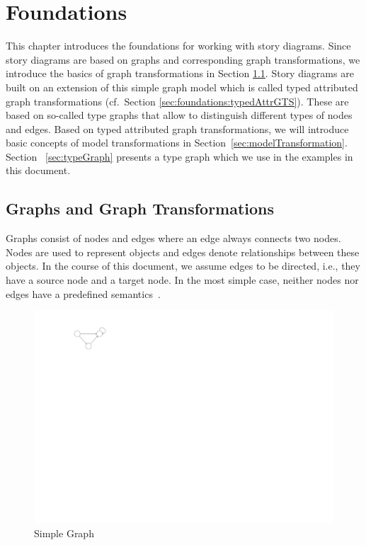 \chapter{Foundations}
\label{sec:foundations}

This chapter introduces the foundations for working with story diagrams.
Since story diagrams are based on graphs and corresponding graph transformations,
we introduce the basics of graph transformations in Section \ref{sec:foundations:simpleGTS}.
Story diagrams are built on an extension of this simple graph model which is called typed attributed graph transformations (cf.\ Section \ref{sec:foundations:typedAttrGTS}).
These are based on so-called type graphs that allow to distinguish different types of nodes and edges.
Based on typed attributed graph transformations, we will introduce basic concepts of model transformations in Section~\ref{sec:modelTransformation}.
Section~ \ref{sec:typeGraph} presents a type graph which we use in the examples in this document.

\section{Graphs and Graph Transformations}
\label{sec:foundations:simpleGTS}

Graphs consist of nodes and edges where an edge always connects two nodes. Nodes are used to represent objects and edges denote relationships between these objects. In the course of this document, we assume edges to be directed, i.e., they have a source node and a target node. In the most simple case, neither nodes nor edges have a predefined semantics~\cite{Roz97}.

\begin{figure}[htbp]
  \centering
  \includegraphics[scale=1.5]{figures/SimpleGraph}
  \caption{Simple Graph}
  \label{fig:simpleGraph}
\end{figure}

